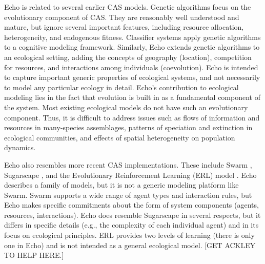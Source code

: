 
Echo is related to several earlier CAS models.
Genetic algorithms \cite{Holland92} focus on the evolutionary
component of CAS\@.  They are reasonably well understood and mature,
but ignore several important features, including resource allocation,
heterogeneity, and endogenous fitness.  Classifier systems
\cite{HollandEtAl86} apply genetic algorithms to a cognitive modeling 
framework.  Similarly, Echo extends genetic algorithms to an
ecological setting, adding the concepts of geography (location),
competition for resources, and interactions among individuals
(coevolution).  Echo is intended to capture important generic
properties of ecological systems, and not necessarily to model any
particular ecology in detail.  Echo's contribution to ecological
modeling lies in the fact that evolution is built in as a fundamental
component of the system.  Most existing ecological models 
\cite{May74,Caswell89,DeAngelisAndGross92} do not have such an evolutionary 
component.  Thus, it is difficult to address issues such as flows of
information and resources in many-species assemblages, patterns
of speciation and extinction in ecological communities, and effects
of spatial heterogeneity on population dynamics.

Echo also resembles more recent CAS implementations.  These include Swarm
\cite{Langton94}, Sugarscape \cite{Epstein94}, and the 
Evolutionary Reinforcement Learning (ERL) model
\cite{AckleyAndLittman92}.  Echo describes a
family of models, but it is not a generic modeling platform like
Swarm.  Swarm supports a wide range of agent types and interaction
rules, but Echo makes specific commitments about the form of system
components (agents, resources, interactions).  Echo does resemble
Sugarscape in several respects, but it differs in specific details
(e.g., the complexity of each individual agent) and in its focus on
ecological principles.  ERL provides two levels of learning (there is
only one in Echo) and is not intended as a general ecological model.
[GET ACKLEY TO HELP HERE.]  

